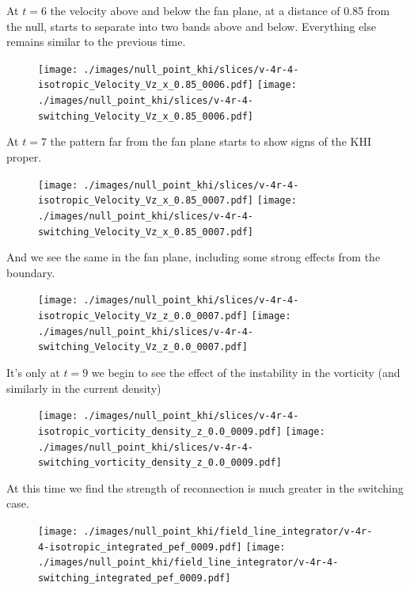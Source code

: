 At $t=6$ the velocity above and below the fan plane, at a distance of 0.85 from the null, starts to separate into two bands above and below. Everything else remains similar to the previous time.

\begin{figure}[H]
  \centering
  \texttt{[image: ./images/null\_point\_khi/slices/v-4r-4-isotropic\_Velocity\_Vz\_x\_0.85\_0006.pdf]}
  \texttt{[image: ./images/null\_point\_khi/slices/v-4r-4-switching\_Velocity\_Vz\_x\_0.85\_0006.pdf]}
\end{figure}

At $t=7$ the pattern far from the fan plane starts to show signs of the KHI proper.

\begin{figure}[H]
  \centering
  \texttt{[image: ./images/null\_point\_khi/slices/v-4r-4-isotropic\_Velocity\_Vz\_x\_0.85\_0007.pdf]}
  \texttt{[image: ./images/null\_point\_khi/slices/v-4r-4-switching\_Velocity\_Vz\_x\_0.85\_0007.pdf]}
\end{figure}

And we see the same in the fan plane, including some strong effects from the boundary.

\begin{figure}[H]
  \centering
  \texttt{[image: ./images/null\_point\_khi/slices/v-4r-4-isotropic\_Velocity\_Vz\_z\_0.0\_0007.pdf]}
  \texttt{[image: ./images/null\_point\_khi/slices/v-4r-4-switching\_Velocity\_Vz\_z\_0.0\_0007.pdf]}
\end{figure}

It's only at $t=9$ we begin to see the effect of the instability in the vorticity (and similarly in the current density)

\begin{figure}[H]
  \centering
  \texttt{[image: ./images/null\_point\_khi/slices/v-4r-4-isotropic\_vorticity\_density\_z\_0.0\_0009.pdf]}
  \texttt{[image: ./images/null\_point\_khi/slices/v-4r-4-switching\_vorticity\_density\_z\_0.0\_0009.pdf]}
\end{figure}

At this time we find the strength of reconnection is much greater in the switching case.

\begin{figure}[H]
  \centering
  \texttt{[image: ./images/null\_point\_khi/field\_line\_integrator/v-4r-4-isotropic\_integrated\_pef\_0009.pdf]}
  \texttt{[image: ./images/null\_point\_khi/field\_line\_integrator/v-4r-4-switching\_integrated\_pef\_0009.pdf]}
\end{figure}

